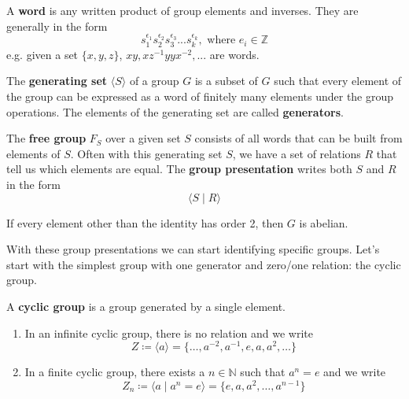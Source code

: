   \begin{definition}[Word]
    A \textbf{word} is any written product of group elements and inverses. They are generally in the form
    \begin{equation}
      s_{1}^{\epsilon_{1}} s_{2}^{\epsilon_{2}} s_{3}^{\epsilon_{3}}... s_{k}^{\epsilon_{k}}, \text{ where } e_i \in \mathbb{Z}
    \end{equation} 
    e.g. given a set $\{x,y,z\}$, $x y, x z^{-1} y y x^{-2},...$ are words. 
  \end{definition}

  \begin{definition}
    The \textbf{generating set} $\langle S \rangle$ of a group $G$ is a subset of $G$ such that every element of the group can be expressed as a word of finitely many elements under the group operations. The elements of the generating set are called \textbf{generators}.
  \end{definition}

  \begin{definition} 
    The \textbf{free group} $F_{S}$ over a given set $S$ consists of all words that can be built from elements of $S$. Often with this generating set $S$, we have a set of relations $R$ that tell us which elements are equal. The \textbf{group presentation} writes both $S$ and $R$ in the form 
    \begin{equation}
      \langle S \mid R \rangle
    \end{equation}
  \end{definition}

  \begin{theorem}
    If every element other than the identity has order 2, then $G$ is abelian. 
  \end{theorem}

  With these group presentations we can start identifying specific groups. Let's start with the simplest group with one generator and zero/one relation: the cyclic group. 

  \begin{definition}
    A \textbf{cyclic group} is a group generated by a single element. 
    \begin{enumerate}
      \item In an infinite cyclic group, there is no relation and we write 
      \begin{equation}
        Z \coloneqq \langle a \rangle = \{ \ldots, a^{-2}, a^{-1}, e, a, a^2, \ldots \}
      \end{equation}

      \item In a finite cyclic group, there exists a $n \in \mathbb{N}$ such that $a^{n} = e$ and we write 
      \begin{equation}
        Z_n \coloneqq \langle a \mid a^n = e \rangle = \{e, a, a^2, \ldots, a^{n-1} \}
      \end{equation}
    \end{enumerate}
  \end{definition} 
  
